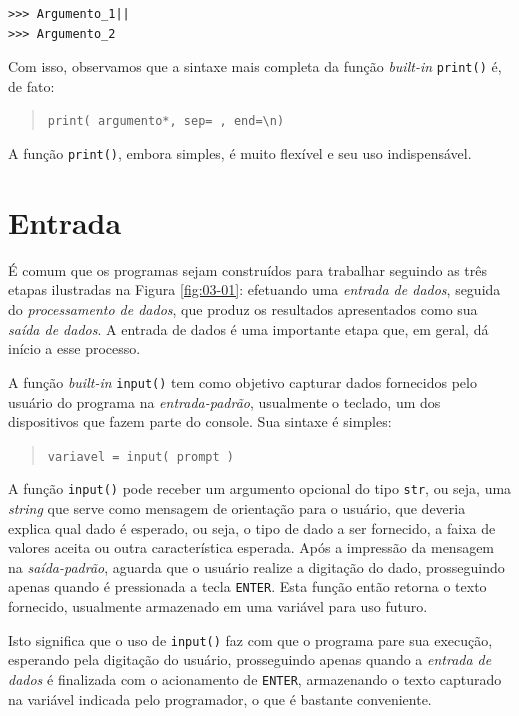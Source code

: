\documentclass[
]{book}
\begin{document}
\begin{verbatim}
>>> Argumento_1||
>>> Argumento_2
\end{verbatim}

Com isso, observamos que a sintaxe mais completa da função \emph{built-in} \texttt{print()} é, de fato:

\begin{quote}
\texttt{print(\ argumento*,\ sep=\textquotesingle{}\ \textquotesingle{},\ end=\textquotesingle{}\textbackslash{}n\textquotesingle{})}
\end{quote}

A função \texttt{print()}, embora simples, é muito flexível e seu uso indispensável.

\hypertarget{e-s-entra}{%
\section{Entrada}\label{e-s-entra}}

É comum que os programas sejam construídos para trabalhar seguindo as três etapas ilustradas na Figura \ref{fig:03-01}: efetuando uma \emph{entrada de dados}, seguida do \emph{processamento de dados}, que produz os resultados apresentados como sua \emph{saída de dados}. A entrada de dados é uma importante etapa que, em geral, dá início a esse processo.

A função \emph{built-in} \texttt{input()} tem como objetivo capturar dados fornecidos pelo usuário do programa na \emph{entrada-padrão}, usualmente o teclado, um dos dispositivos que fazem parte do console. Sua sintaxe é simples:

\begin{quote}
\texttt{variavel\ =\ input(\ prompt\ )}
\end{quote}

A função \texttt{input()} pode receber um argumento opcional do tipo \texttt{str}, ou seja, uma \emph{string} que serve como mensagem de orientação para o usuário, que deveria explica qual dado é esperado, ou seja, o tipo de dado a ser fornecido, a faixa de valores aceita ou outra característica esperada. Após a impressão da mensagem na \emph{saída-padrão}, aguarda que o usuário realize a digitação do dado, prosseguindo apenas quando é pressionada a tecla \texttt{ENTER}. Esta função então retorna o texto fornecido, usualmente armazenado em uma variável para uso futuro.

Isto significa que o uso de \texttt{input()} faz com que o programa pare sua execução, esperando pela digitação do usuário, prosseguindo apenas quando a \emph{entrada de dados} é finalizada com o acionamento de \texttt{ENTER}, armazenando o texto capturado na variável indicada pelo programador, o que é bastante conveniente.
\end{document}
